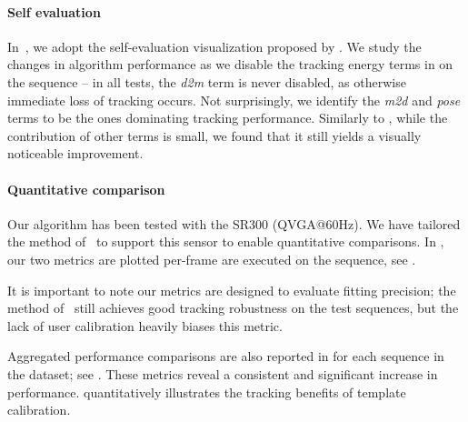 

\paragraph{Self evaluation}
% 
In~, we adopt the self-evaluation visualization proposed by \cite{taylor2016concerto}. We study the changes in algorithm performance as we disable the tracking energy terms in  on the  sequence -- in all tests, the \emph{d2m} term is never disabled, as otherwise immediate loss of tracking occurs. Not surprisingly, we identify the \emph{m2d} and \emph{pose} terms to be the ones dominating tracking performance.
Similarly to \cite{taylor2016concerto}, while the contribution of other terms is small, we found that it still yields a visually noticeable improvement.

\paragraph{Quantitative comparison}
Our algorithm has been tested with the \realsense{} SR300 (QVGA@60Hz).  We have tailored the method of~\cite{tagliasacchi2015robust} to support this sensor to enable quantitative comparisons. In , our two metrics are plotted per-frame  are executed on the  sequence,  see \VideoHTrack{}. 
\begin{draft}
It is important to note our metrics are designed to evaluate fitting precision; the method of~\cite{sharp2015accurate} still achieves good tracking robustness on the test sequences, but the lack of user calibration heavily biases this metric.
\end{draft}
Aggregated performance comparisons are also reported in  for each sequence in the \handy{} dataset; see \VideoExtra{}. These metrics reveal a consistent and significant increase in performance.  quantitatively illustrates the tracking benefits of template calibration.


